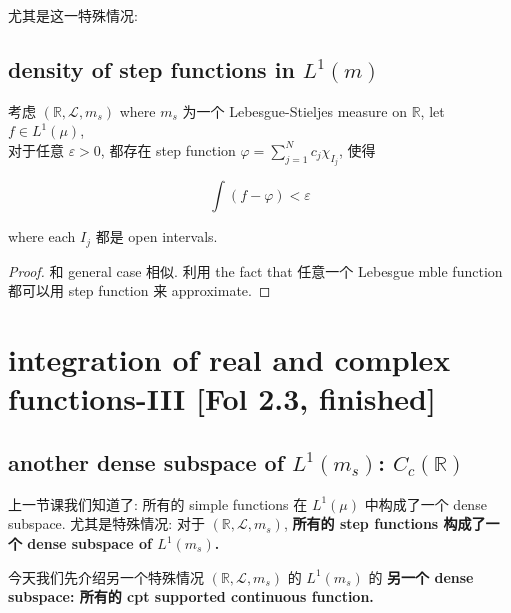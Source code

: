 尤其是这一特殊情况:

\subsection{\texorpdfstring{density of step functions in \(L^{1}(m)\)}{density of step functions in L\^{}\{1\}(m)}}\label{density-of-step-functions-in-l1m}

\begin{theorem}{}

考虑 \((\mathbb{R},\mathcal{L},m_{s})\) where \(m_{s}\) 为一个 Lebesgue-Stieljes measure on \(\mathbb{R}\), let \(f \in L^{1}(\mu)\),\\
对于任意 \(\varepsilon > 0\), 都存在 step function \(\varphi = \sum_{j = 1}^{N}c_{j}\chi_{I_{j}}\), 使得

\[\int(f - \varphi) < \varepsilon\]

where each \(I_{j}\) 都是 open intervals.

\end{theorem}

\begin{proof}

和 general case 相似. 利用 the fact that 任意一个 Lebesgue mble function 都可以用 step function 来 approximate.

\end{proof}

\section{integration of real and complex functions-III {[}Fol 2.3, finished{]}}

\subsection{\texorpdfstring{another dense subspace of \(L^{1}(m_{s})\): \(C_{c}(\mathbb{R})\)}{another dense subspace of L\^{}\{1\}(m\_\{s\}): C\_\{c\}(\textbackslash mathbb\{R\})}}

上一节课我们知道了: 所有的 simple functions 在 \(L^{1}(\mu)\) 中构成了一个 dense subspace. 尤其是特殊情况: 对于 \((\mathbb{R},\mathcal{L},m_{s})\), \textbf{所有的 step functions 构成了一个 dense subspace of \(L^{1}(m_{s})\).}

今天我们先介绍另一个特殊情况 \((\mathbb{R},\mathcal{L},m_{s})\) 的 \(L^{1}(m_{s})\) 的 \textbf{另一个 dense subspace: 所有的 cpt supported continuous function.}

